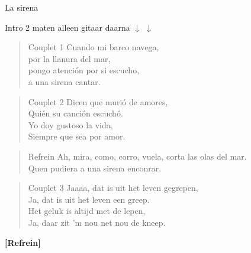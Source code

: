 \begin{song}{La sirena}

\begin{instrumental}{Intro}
2 maten alleen gitaar  daarna
 \measure{}\measure{} 
  \measure{}\measure{} 
 \measure{}\measure{} 
     $\downarrow$ $\downarrow$
\end{instrumental}

\begin{verse}{Couplet 1}
Cuando mi barco navega,\\ 
por la llanura del mar,\\ 
\chord{}pongo atención por si escucho,\\ 
a una sirena cantar.\\ 
\end{verse}

\begin{verse}{Couplet 2}
Dicen que murió de amores,\\ 
Quién su canción escuchó. \\
\chord{}Yo doy gustoso la vida, \\
Siempre que sea por amor. \\
\end{verse}

\begin{verse}{Refrein}
Ah, mira, como,  corro, vuela, corta las olas del mar.\\
Quen pudiera a una sirena enconrar.
\end{verse}

\begin{verse}{Couplet 3}
Jaaaa, dat is uit het leven gegrepen,\\
Ja, dat is uit het leven een greep.\hspace{1.5em}\\
Het geluk is altijd met de lepen,\\
Ja, daar zit 'm nou net nou de kneep.\hspace{1.5em}
\end{verse}

\textbf{[Refrein]}\\

\end{song}
